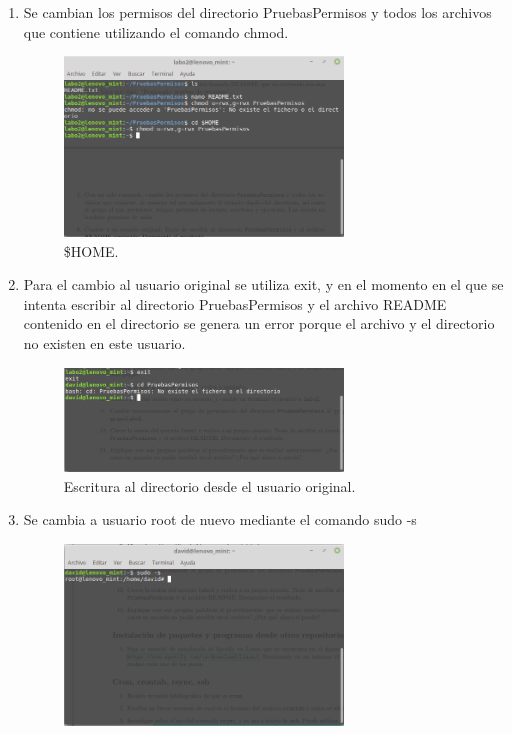 \documentclass[11pt]{article}
\begin{document}
\begin{enumerate}
\begin{figure}[H]
\end{figure}

\item Se cambian los permisos del directorio PruebasPermisos y todos los archivos que contiene utilizando el comando chmod.
\begin{figure}[H]
  \centering
    \includegraphics[width=0.7\textwidth]{img/6}
  \caption{\$HOME.}
 
\end{figure}

\item Para el cambio al usuario original se utiliza exit, y en el momento en el que se intenta escribir al directorio PruebasPermisos y el archivo README contenido en el directorio se genera un error porque el archivo y el directorio no existen en este usuario. 
\begin{figure}[H]
  \centering
    \includegraphics[width=0.7\textwidth]{img/7}
  \caption{Escritura al directorio desde el usuario original.}
 
\end{figure}

\item Se cambia a usuario root de nuevo mediante el comando sudo -s
\begin{figure}[H]
  \centering
    \includegraphics[width=0.7\textwidth]{img/8}
  \caption{}
 

\end{figure}
\end{enumerate}
\end{document}
